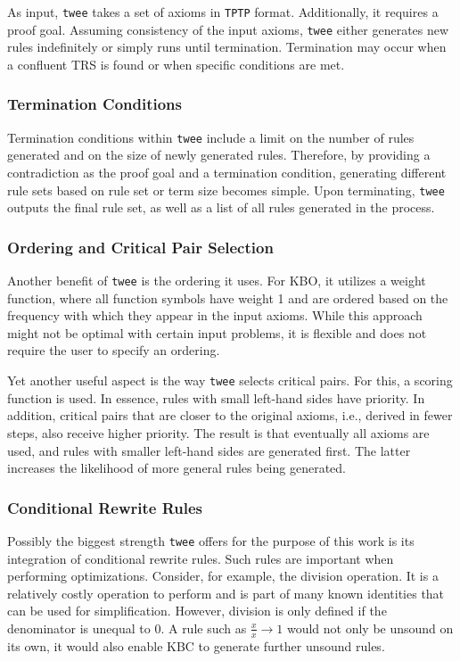 As input, \texttt{twee} takes a set of axioms in \texttt{TPTP} format. Additionally, it requires a proof goal. Assuming consistency of the input axioms, \texttt{twee} either generates new rules indefinitely or simply runs until termination. Termination may occur when a confluent TRS is found or when specific conditions are met. 

\subsubsection{Termination Conditions}
Termination conditions within \texttt{twee} include a limit on the number of rules generated and on the size of newly generated rules. Therefore, by providing a contradiction as the proof goal and a termination condition, generating different rule sets based on rule set or term size becomes simple. Upon terminating, \texttt{twee} outputs the final rule set, as well as a list of all rules generated in the process.

\subsubsection{Ordering and Critical Pair Selection}
Another benefit of \texttt{twee} is the ordering it uses. For KBO, it utilizes a weight function, where all function symbols have weight 1 and are ordered based on the frequency with which they appear in the input axioms. While this approach might not be optimal with certain input problems, it is flexible and does not require the user to specify an ordering.

Yet another useful aspect is the way \texttt{twee} selects critical pairs. For this, a scoring function is used. In essence, rules with small left-hand sides have priority. In addition, critical pairs that are closer to the original axioms, i.e., derived in fewer steps, also receive higher priority. The result is that eventually all axioms are used, and rules with smaller left-hand sides are generated first. The latter increases the likelihood of more general rules being generated.

\subsubsection{Conditional Rewrite Rules}
Possibly the biggest strength \texttt{twee} offers for the purpose of this work is its integration of conditional rewrite rules. Such rules are important when performing optimizations. Consider, for example, the division operation. It is a relatively costly operation to perform and is part of many known identities that can be used for simplification. However, division is only defined if the denominator is unequal to 0. A rule such as $\frac{x}{x} \to 1$ would not only be unsound on its own, it would also enable KBC to generate further unsound rules.

